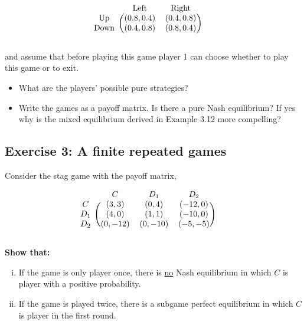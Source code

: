 \documentclass[10pt]{article}
\begin{document}
\begin{equation*}
    \begin{blockarray}{ccc}
        & \text{Left} & \text{Right} \\
        \begin{block}{c(cc)}
            \text{Up} &    (0.8, 0.4) & (0.4, 0.8) \\
            \text{Down} & (0.4, 0.8) & (0.8, 0.4) \\
        \end{block}
    \end{blockarray}\qquad
\end{equation*}

and assume that before playing this game player 1 can choose whether to play
this game or to exit.

\begin{itemize}
    \item What are the players' possible pure strategies?
    \item Write the games as a payoff matrix. Is there a pure Nash equilibrium?
    If yes why is the mixed equilibrium derived in Example 3.12 more
    compelling?
\end{itemize}

\subsection*{Exercise 3: A finite repeated games}

Consider the stag game with the payoff matrix,

\begin{equation*}
    \begin{blockarray}{cccc}
        & C & D_1 & D_2 \\
        \begin{block}{c(ccc)}
            C   & (3, 3)   & (0, 4)   & (-12, 0) \\
            D_1 & (4, 0)   & (1, 1)   & (-10, 0) \\
            D_2 & (0, -12) & (0, -10) & (-5, -5) \\
        \end{block}
    \end{blockarray}\qquad
\end{equation*}

\textbf{Show that:}

\begin{enumerate}[(i)]
    \item If the game is only player once, there is \underline{no} Nash equilibrium
    in which \(C\) is player with a positive probability.
    \item If the game is played twice, there is a subgame perfect equilibrium
    in which \(C\) is player in the first round.
\end{enumerate}
\end{document}
